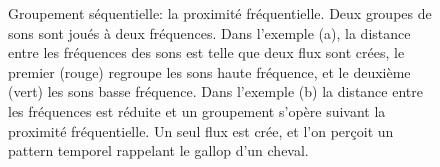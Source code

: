 \begin{figure}[bth]
        \myfloatalign
        \caption[Groupement séquentiel : proximité fréquentielle.]{Groupement séquentielle: la proximité fréquentielle. Deux groupes de sons sont joués à deux fréquences. Dans l'exemple (a), la distance entre les fréquences des sons est telle que deux flux sont crées, le premier (rouge) regroupe les sons haute fréquence, et le deuxième (vert) les sons basse fréquence. Dans l'exemple (b) la distance entre les fréquences est réduite et un groupement s'opère suivant la proximité fréquentielle. Un seul flux est crée, et l'on perçoit un pattern temporel rappelant le gallop d'un cheval.}\label{fig:gallop}
\end{figure}

